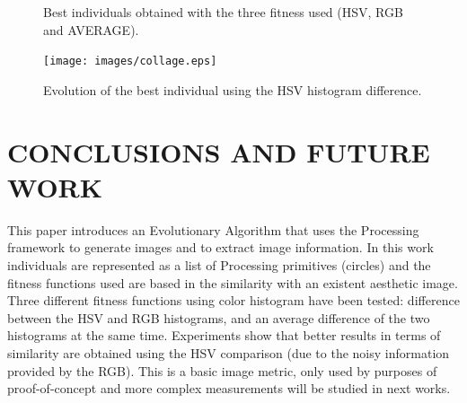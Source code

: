 \documentclass[a4paper,twoside]{article}
\begin{document}
\begin{figure}[ht]
{ }
\caption{Best individuals obtained with the three fitness used (HSV, RGB and AVERAGE).}
\label{fig:bestinds}
\end{figure}

\begin{figure}
   \texttt{[image: images/collage.eps]}
\caption{Evolution of the best individual using the HSV histogram difference. }
\label{fig:collage}
\end{figure}

\section{\uppercase{Conclusions and Future Work}}
\label{sec:conclusions}
\noindent This paper introduces an Evolutionary Algorithm that uses the Processing framework to generate images and to extract image information. %
In this work individuals are represented as a list of Processing primitives (circles) and the fitness functions used are based in the similarity with an existent aesthetic image. Three different fitness functions using color histogram have been tested: difference between the HSV and RGB histograms, and an average difference of the two histograms at the same time. Experiments show that better results in terms of similarity are obtained using the HSV comparison (due to the noisy information provided by the RGB). This is a basic image metric, only used by purposes of proof-of-concept and more complex measurements will be studied in next works.
\end{document}
